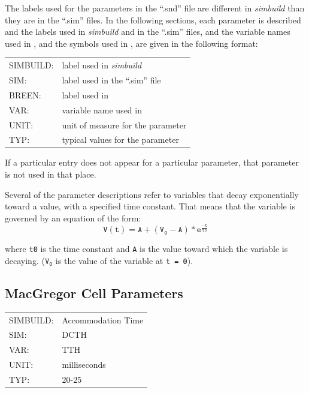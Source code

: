\documentclass[12pt,openany,oneside]{book}
\newcommand{\ticode}[1]{\texttt{#1}}
\newcommand{\tmcode}[1]{\mathtt{#1}}
\newcommand{\prog}[1]{\textit{{#1}}}
\newcommand{\ext}[1]{{{``.#1''}}}
\begin{document}
The labels used for the parameters in the \ext{snd} file are different in 
\prog{simbuild} than they are in the \ext{sim} files. In the following sections, each
parameter is described and the labels used in \prog{simbuild} and in the
\ext{sim} files, and the variable names used in \citet {macgregor1987neural},
and the symbols used in \citet {breenhybrid2003}, are given in 
the following format:

\begin{flushleft}
\begin{tabular}{@{}ll@{}}
SIMBUILD:  &  label used in \prog{simbuild}\\
SIM:  &  label used in the \ext{sim} file\\
BREEN: & label used in \citet {breenhybrid2003} \\
VAR:  &  variable name used in {\citet{macgregor1987neural}} \\
UNIT:  &  unit of measure for the parameter\\
TYP:  &  typical values for the parameter\\
\end{tabular}
\end{flushleft}

If a particular entry does not appear for a particular parameter, that
parameter is not used in that place.

Several of the parameter descriptions refer to variables that decay
exponentially toward a value, with a specified time constant. That
means that the variable is governed by an equation of the form:
$$
\tmcode{V(t) = A + (V_0 - A) * e^{\tfrac{-t}{t0}}}
$$

\noindent
where \ticode{t0} is the time constant and \ticode{A} is the value toward which the
variable is decaying. ($\tmcode{V_0}$ is the value of the variable at
\ticode{t = 0}).


\vspace{\fill}

\subsection{MacGregor Cell Parameters}
\label{MacGregor Parameters}

\label{TTH}
\begin{flushleft}
\begin{tabular}{@{}ll@{}}
SIMBUILD:  &  Accommodation Time\\
SIM:  &  DCTH\\
VAR:  &  TTH\\
UNIT:  &  milliseconds\\
TYP:  &  20-{}25\\
\end{tabular}
\end{flushleft}
\end{document}
